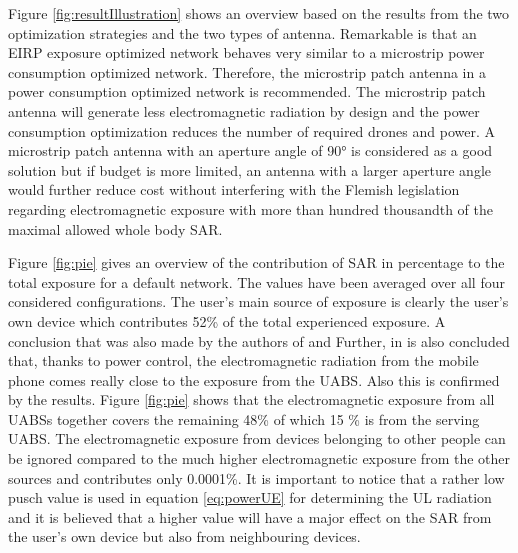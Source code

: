 \documentclass[twocolumn]{phdsymp} %
\begin{document}
Figure \ref{fig:resultIllustration} shows an overview based on the results from the two optimization strategies and the two types of antenna.
Remarkable is that an \gls{EIRP} exposure optimized network behaves very similar to a microstrip power consumption optimized network.
Therefore, the microstrip patch antenna in a power consumption optimized network is recommended. 
The microstrip patch antenna will generate less electromagnetic radiation by design and
the power consumption optimization reduces the number of required drones and power. A microstrip patch antenna with an aperture 
angle of \ang{90} is considered as a good solution but if budget is more limited, an antenna with a larger aperture angle 
would further reduce cost without interfering with the Flemish legislation regarding electromagnetic exposure  
with more than hundred thousandth of the maximal allowed whole body \gls{SAR}.


Figure \ref{fig:pie} gives
an overview of the contribution of \gls{SAR} in percentage to the total 
exposure for a default network. The values have been averaged over all four considered configurations. 
The user's main source of exposure is clearly the user's own device which contributes 52\% of the total experienced exposure.
A conclusion that was also made by the authors of \cite{J17_kuehn2019modelling} and  \cite{J10.1.1} 
Further, in \cite{J10.1.1} is also concluded that,
thanks to power control, the electromagnetic radiation from the mobile phone 
comes really close to the exposure from the \gls{UABS}. 
Also this is confirmed by the results. Figure \ref{fig:pie} shows that the electromagnetic exposure 
from all \gls{UABS}s together covers the remaining 48\% of which 15 \% is from the serving UABS. 
The electromagnetic
 exposure from devices belonging to other people can be ignored compared to the much higher electromagnetic exposure from the other sources
 and contributes only 0.0001\%. It is important to notice that a rather low \gls{pusch} value is used in equation \ref{eq:powerUE} for determining the 
 \gls{UL} radiation and it is believed that a higher value will have a major effect on the \gls{SAR} from the user's own 
 device but also from neighbouring devices.

\end{document}
